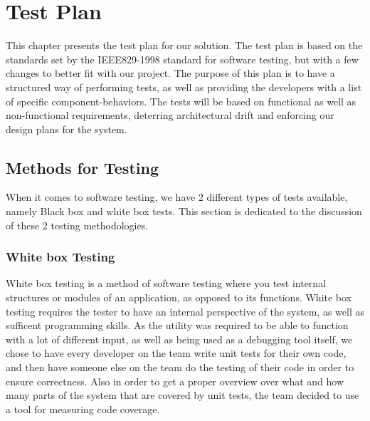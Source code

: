 \chapter{Test Plan}
This chapter presents the test plan for our solution. The test plan is based on
the standards set by the IEEE829-1998 standard for software testing\cite{IEEE829}, but with a
few changes to better fit with our project. The purpose of this plan is to have
a structured way of performing tests, as well as providing the developers with
a list of specific component-behaviors. The tests will be based on functional as
well as non-functional requirements, deterring architectural drift and
enforcing our design plans for the system.


\section{Methods for Testing}
When it comes to software testing, we have 2 different types of tests available, namely Black box and white box tests. This section is dedicated to the discussion of these 2 testing methodologies.


\subsection{White box Testing}
White box testing is a method of software testing where you test internal structures or modules of an application, as opposed to its functions. White box testing requires the tester to have an internal perspective of the system, as well as sufficent programming skills. As the \gls{utility} was required to be able to function with a lot of different input, as well as being used as a debugging tool itself, we chose to have every developer on the team write unit tests for their own code, and then have someone else on the team do the testing of their code in order to ensure correctness. Also in order to get a proper overview over what and how many parts of the system that are covered by unit tests, the team decided to use a tool for measuring code coverage.

